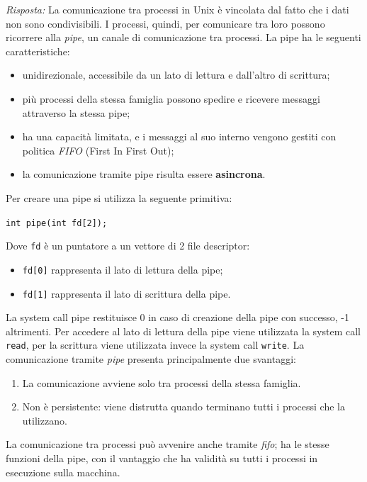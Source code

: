 \documentclass{article}
\newenvironment{solution}
    {\textit{Risposta:}}
    {}
\begin{document}
\begin{solution}
La comunicazione tra processi in Unix è vincolata dal fatto che i dati non sono condivisibili.
\newline
I processi, quindi, per comunicare tra loro possono ricorrere alla \textit{pipe}, un canale di comunicazione tra processi.
La pipe ha le seguenti caratteristiche:
\begin{itemize}
    \item unidirezionale, accessibile da un lato di lettura e dall’altro di scrittura;
    \item più processi della stessa famiglia possono spedire e ricevere messaggi attraverso la stessa pipe;
    \item ha una capacità limitata, e i messaggi al suo interno vengono gestiti con politica \textit{FIFO} (First In First Out);
    \item la comunicazione tramite pipe risulta essere \textbf{asincrona}.
\end{itemize}
Per creare una pipe si utilizza la seguente primitiva:
\begin{center}
\texttt{int pipe(int fd[2]);}
\end{center}
Dove \texttt{fd} è un puntatore a un vettore di 2 file descriptor:
\begin{itemize}
    \item \texttt{fd[0]} rappresenta il lato di lettura della pipe;
    \item \texttt{fd[1]} rappresenta il lato di scrittura della pipe.
\end{itemize}
La system call pipe restituisce 0 in caso di creazione della pipe con successo, -1 altrimenti.
\newline
Per accedere al lato di lettura della pipe viene utilizzata la system call \texttt{read}, per la scrittura viene utilizzata invece la system call \texttt{write}.
\newline
La comunicazione tramite \textit{pipe} presenta principalmente due svantaggi:
\begin{enumerate}
    \item La comunicazione avviene solo tra processi della stessa famiglia.
    \item Non è persistente: viene distrutta quando terminano tutti i processi che la utilizzano.
\end{enumerate}
La comunicazione tra processi può avvenire anche tramite \textit{fifo}; ha le stesse funzioni della pipe, con il vantaggio che ha validità su tutti i processi in esecuzione sulla macchina.

\end{solution}
\end{document}
